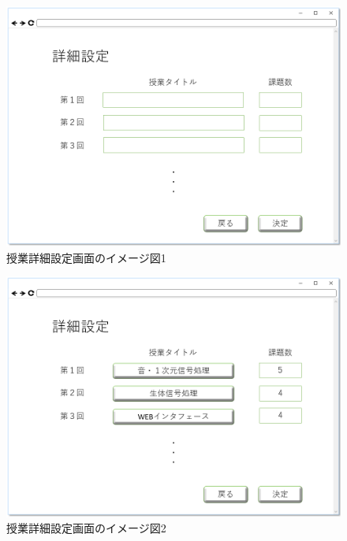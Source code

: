 \begin{figure}[htbp]
\begin{center}
  \includegraphics[width=1\linewidth,clip]{./img/sc_class_detail1.png}
  \caption{授業詳細設定画面のイメージ図1}\label{fig:sc_class_detail1}
\end{center}
\end{figure}

\begin{figure}[htbp]
\begin{center}
  \includegraphics[width=1\linewidth,clip]{./img/sc_class_detail2.png}
  \caption{授業詳細設定画面のイメージ図2}\label{fig:sc_class_detail2}
\end{center}
\end{figure}

